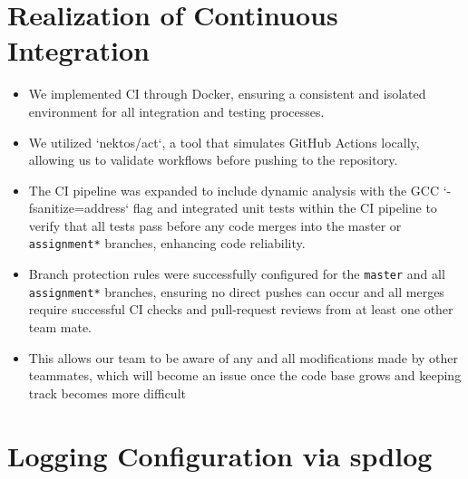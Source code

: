 \documentclass{article}
\begin{document}
\section{Realization of Continuous Integration}
\label{sec:ci}

\begin{itemize}
    \item We implemented CI through Docker, ensuring a consistent and isolated environment for all integration and testing processes.
    \item We utilized `nektos/act`, a tool that simulates GitHub Actions locally, allowing us to validate workflows before pushing to the repository.
    \item The CI pipeline was expanded to include dynamic analysis with the GCC `-fsanitize=address` flag and integrated unit tests within the CI pipeline to verify that all tests pass before any code merges into the master or \verb|assignment*| branches, enhancing code reliability.
    \item Branch protection rules were successfully configured for the \verb|master| and all \verb|assignment*| branches, ensuring no direct pushes can occur and all merges require successful CI checks and pull-request reviews from at least one other team mate.
    \item This allows our team to be aware of any and all modifications made by other teammates, which will become an issue once the code base grows and keeping track becomes more difficult
\end{itemize}

\section{Logging Configuration via spdlog}
\label{sec:spd}
\end{document}
